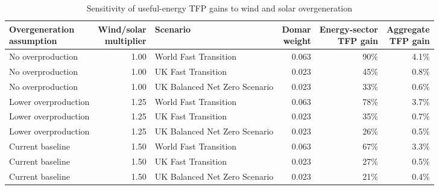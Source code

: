 
\begin{longtable}[t]{lrlrrr}
\caption{\label{tab:tab_main_overgeneration_sensitivity}Sensitivity of useful-energy TFP gains to wind and solar overgeneration}\\
\toprule
\makecell[l]{Overgeneration\\assumption} & \makecell[r]{Wind/solar\\multiplier} & Scenario & \makecell[r]{Domar\\weight} & \makecell[r]{Energy-sector\\TFP gain} & \makecell[r]{Aggregate\\TFP gain}\\
\midrule
No overproduction & 1.00 & World Fast Transition & 0.063 & 90\% & 4.1\%\\
No overproduction & 1.00 & UK Fast Transition & 0.023 & 45\% & 0.8\%\\
No overproduction & 1.00 & UK Balanced Net Zero Scenario & 0.023 & 33\% & 0.6\%\\
Lower overproduction & 1.25 & World Fast Transition & 0.063 & 78\% & 3.7\%\\
Lower overproduction & 1.25 & UK Fast Transition & 0.023 & 35\% & 0.7\%\\
\addlinespace
Lower overproduction & 1.25 & UK Balanced Net Zero Scenario & 0.023 & 26\% & 0.5\%\\
Current baseline & 1.50 & World Fast Transition & 0.063 & 67\% & 3.3\%\\
Current baseline & 1.50 & UK Fast Transition & 0.023 & 27\% & 0.5\%\\
Current baseline & 1.50 & UK Balanced Net Zero Scenario & 0.023 & 21\% & 0.4\%\\
\bottomrule
\end{longtable}
